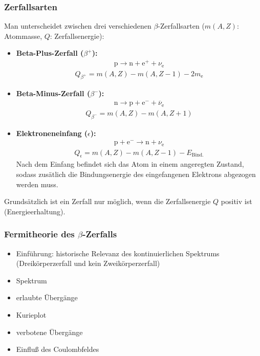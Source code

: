 \documentclass[11pt, a4paper]{article}
\numberwithin{equation}{section}
\begin{document}
\subsubsection{Zerfallsarten}
Man unterscheidet zwischen drei verschiedenen $\beta$-Zerfallsarten ($m(A,Z)$: Atommasse, $Q$: Zerfallsenergie):
\begin{itemize}
	\item \textbf{Beta-Plus-Zerfall ($\beta^+$):}
	\begin{align}
	\mathrm{p} \to \mathrm{n} + \mathrm{e}^+ + \nu_\mathrm{e}
	\end{align}
	\begin{align}
		Q_{\beta^+} = m( A, Z ) - m( A, Z - 1) - 2 m_\mathrm{e}
	\end{align}
	
	\item \textbf{Beta-Minus-Zerfall ($\beta^-$):}
	\begin{align}
	\mathrm{n} \to \mathrm{p} + \mathrm{e}^- + \overline{\nu}_\mathrm{e}
	\end{align}
	\begin{align}
	Q_{\beta^-} = m( A, Z ) - m( A, Z + 1)
	\end{align}
	
	\item \textbf{Elektroneneinfang ($\epsilon$):}
	\begin{align}
	\mathrm{p} + \mathrm{e}^- \to \mathrm{n} + \nu_\mathrm{e}
	\end{align}
	\begin{align}
	Q_{\epsilon} = m( A, Z ) - m( A, Z - 1) - E_\mathrm{Bind.}
	\end{align}
	Nach dem Einfang befindet sich das Atom in einem angeregten Zustand, sodass zusätlich die Bindungsenergie des eingefangenen Elektrons abgezogen werden muss.
\end{itemize}
Grundsätzlich ist ein Zerfall nur möglich, wenn die Zerfallsenergie $Q$ positiv ist (Energieerhaltung).

\subsubsection{Fermitheorie des $\beta$-Zerfalls}
\begin{itemize}
	\item Einführung: historische Relevanz des kontinuierlichen Spektrums (Dreikörperzerfall und kein Zweikörperzerfall)
	\item Spektrum
	\item erlaubte Übergänge
	\item Kurieplot
	\item verbotene Übergänge
	\item Einfluß des Coulombfeldes
\end{itemize}
\end{document}
